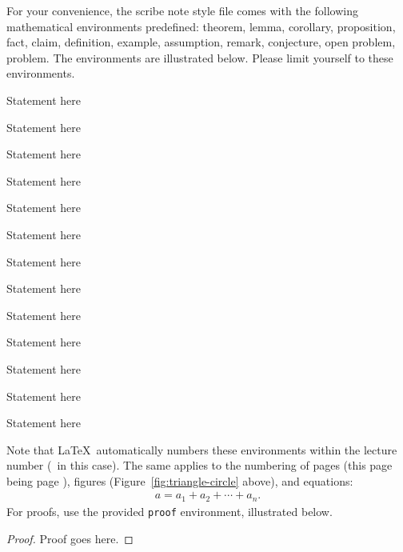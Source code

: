 \documentclass[usletter]{article}
\begin{document}
For your convenience, the scribe note style file comes
with the following mathematical environments
predefined: theorem, lemma, corollary, proposition,
fact, claim, definition, example, assumption, remark,
conjecture, open problem, problem. The environments are
illustrated below.  Please limit yourself to these
environments.

\begin{theorem}
Statement here
\end{theorem}

\begin{lemma}
Statement here
\end{lemma}

\begin{corollary}
Statement here
\end{corollary}

\begin{proposition}
Statement here
\end{proposition}

\begin{fact}
Statement here
\end{fact}

\begin{claim}
Statement here
\end{claim}

\begin{definition}
Statement here
\end{definition}

\begin{example}
Statement here
\end{example}

\begin{assumption}
Statement here
\end{assumption}

\begin{remark}
Statement here
\end{remark}

\begin{conjecture}
Statement here
\end{conjecture}

\begin{openproblem}
Statement here
\end{openproblem}

\begin{problem}
Statement here
\end{problem}


\noindent
Note that \LaTeX\ automatically numbers these
environments within the lecture number (\thelecture\ in
this case).  The same applies to the numbering of pages
(this page being page \thepage), figures
(Figure~\ref{fig:triangle-circle} above), and
equations:
\begin{align}
a = a_1+a_2+\cdots+a_n.
\end{align}
\noindent
For proofs, use the provided {\tt proof} environment,
illustrated below.

\begin{proof}
Proof goes here.
\end{proof}




\end{document}
